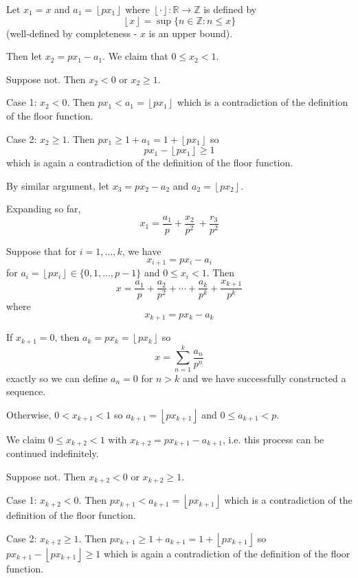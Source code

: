 \documentclass[12pt]{article}
\newcommand{\R}{\mathbb{R}}
\newcommand{\Z}{\mathbb{Z}}
\newcommand{\floor}[1]{\left\lfloor #1 \right\rfloor}
\newenvironment*{proof}[1][blue]{
    \begin{tcolorbox}[
        parbox=false,
        colback=#1!5!white,
        colframe=#1!75!black,
        coltext=#1,
        breakable
    ]}
    {\end{tcolorbox}}
\begin{document}
    \color{blue}   
        Let $x_1 = x$ and $a_1 = \floor{px_1}$ where $\floor{\cdot}: \R \to \Z$ is defined by 
        \[\floor{x} = \sup\{n \in \Z: n \leq x\}\]
        (well-defined by completeness - $x$ is an upper bound). 

        Then let $x_2 = px_1 - a_1$. We claim that $0 \leq x_2 < 1$.

        \begin{proof}
            Suppose not. Then $x_2 < 0$ or $x_2 \geq 1$. 

            Case 1: $x_2 < 0$. Then $px_1 < a_1 = \floor{px_1}$ which is a contradiction of the definition of the floor function.
            
            Case 2: $x_2 \geq 1$. Then $px_1 \geq 1 + a_1 = 1 + \floor{px_1}$ so 
            \[px_1 - \floor{px_1} \geq 1\]
            which is again a contradiction of the definition of the floor function.
        \end{proof}

        By similar argument, let $x_3 = px_2 - a_2$ and $a_2 = \floor{px_2}$. 

        Expanding so far, 
        \[x_1 = \frac{a_1}{p} + \frac{x_2}{p^2}\ + \frac{r_3}{p^2}\]

        Suppose that for $i = 1, \dots, k$, we have 
        \[x_{i + 1} = px_i - a_i\]
        for $a_i = \floor{px_i} \in \{0, 1, \dots, p-1\}$ and $0 \leq x_i < 1$. Then 
        \[x = \frac{a_1}{p} + \frac{a_2}{p^2} + \cdots + \frac{a_k}{p^k} + \frac{x_{k+1}}{p^k}\]
        where 
        \[x_{k+1} = px_k - a_k\]

        If $x_{k + 1} = 0$, then $a_k = px_k = \floor{px_k}$ so 
        \[x = \sum_{n=1}^{k} \frac{a_n}{p^n}\]
        exactly so we can define $a_n = 0$ for $n > k$ and we have successfully constructed a sequence. 

        Otherwise, $0 < x_{k+1} < 1$ so $a_{k+1} = \floor{px_{k+1}}$ and $0 \leq a_{k+1} < p$. 
        
        We claim $0 \leq x_{k+2} < 1$ with $x_{k+2} = px_{k+1} - a_{k+1}$, i.e. this process can be continued indefinitely.

        \begin{proof}
            Suppose not. Then $x_{k+2} < 0$ or $x_{k+2} \geq 1$.

            Case 1: $x_{k+2} < 0$. Then $px_{k+1} < a_{k+1} = \floor{px_{k+1}}$ which is a contradiction of the definition of the floor function.

            Case 2: $x_{k+2} \geq 1$. Then $px_{k+1} \geq 1 + a_{k+1} = 1 + \floor{px_{k+1}}$ so $px_{k+1} - \floor{px_{k+1}} \geq 1$ which is again a contradiction of the definition of the floor function.
        \end{proof}
\end{document}
